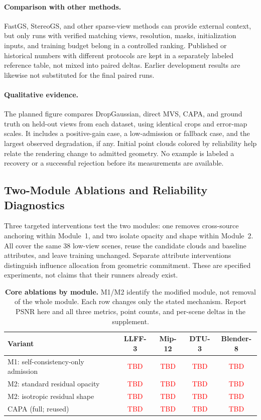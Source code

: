 \documentclass{article}
\newcommand{\ours}{CAPA}
\newcommand{\PH}[1]{\textcolor{red}{#1}}
\newcommand{\pending}{\PH{\textnormal{TBD}}}
\begin{document}
\paragraph{Comparison with other methods.}
FastGS, StereoGS, and other sparse-view methods can provide external context, but only runs with verified matching views, resolution, masks, initialization inputs, and training budget belong in a controlled ranking. Published or historical numbers with different protocols are kept in a separately labeled reference table, not mixed into paired deltas. Earlier development results are likewise not substituted for the final paired runs.

\paragraph{Qualitative evidence.}
The planned figure compares DropGaussian, direct MVS, \ours{}, and ground truth on held-out views from each dataset, using identical crops and error-map scales. It includes a positive-gain case, a low-admission or fallback case, and the largest observed degradation, if any. Initial point clouds colored by reliability help relate the rendering change to admitted geometry. No example is labeled a recovery or a successful rejection before its measurements are available.

\subsection{Two-Module Ablations and Reliability Diagnostics}
\label{sec:ablations}

Three targeted interventions test the two modules: one removes cross-source anchoring within Module~1, and two isolate opacity and shape within Module~2. All cover the same 38 low-view scenes, reuse the candidate clouds and baseline attributes, and leave training unchanged. Separate attribute interventions distinguish influence allocation from geometric commitment. These are specified experiments, not claims that their runners already exist.

\begin{table}[t]
\caption{\textbf{Core ablations by module.} M1/M2 identify the modified module, not removal of the whole module. Each row changes only the stated mechanism. Report PSNR here and all three metrics, point counts, and per-scene deltas in the supplement.}
\label{tab:ablation}
\centering\small
\setlength{\tabcolsep}{4pt}
\begin{tabular}{@{}lcccc@{}}
\toprule
Variant & LLFF-3 & Mip-12 & DTU-3 & Blender-8\\
\midrule
M1: self-consistency-only admission & \pending & \pending & \pending & \pending\\
M2: standard residual opacity & \pending & \pending & \pending & \pending\\
M2: isotropic residual shape & \pending & \pending & \pending & \pending\\
\ours{} (full; reused) & \pending & \pending & \pending & \pending\\
\bottomrule
\end{tabular}
\end{table}
\end{document}
